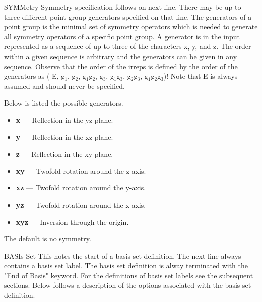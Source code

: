 \begin{keywordlist}
\item[SYMMetry]
 Symmetry specification follows on next line. There may be up to
three different point group generators specified on that line. The
generators of a point group is the minimal set of symmetry operators
which is needed to generate all symmetry
operators of a specific point group. A generator is in the input
represented as a sequence of up to three of the characters x, y, and
z. The order within a given sequence is arbitrary and the generators
can be given in any sequence. Observe that the order of the irreps
is defined by the order of the generators as
( E, g$_1$, g$_2$, g$_1$g$_2$, g$_3$, g$_1$g$_3$, g$_2$g$_3$,
g$_1$g$_2$g$_3$)! Note that E is always assumed and should never
be specified.

Below is listed the possible generators.
\begin{itemize}
\item {\bf x} --- Reflection in the yz-{}plane.
\item {\bf y} --- Reflection in the xz-{}plane.
\item {\bf z} --- Reflection in the xy-{}plane.
\item {\bf xy} --- Twofold rotation around the z-{}axis.
\item {\bf xz} --- Twofold rotation around the y-{}axis.
\item {\bf yz} --- Twofold rotation around the x-{}axis.
\item {\bf xyz} --- Inversion through the origin.
\end{itemize}
The default is no symmetry.
\item[BASIs Set]
This notes the start of a basis set definition.
The next line always contains a basis set label.
The basis set definition is alway terminated with the "End of Basis" keyword.
For the definitions of basis set labels see the subsequent sections.
Below follows a description of the options associated with the
basis set definition.


\end{keywordlist}
